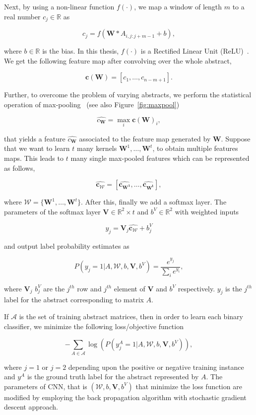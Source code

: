 Next, by using a non-linear function $f(\cdot)$, we map a window of length $m$ to a real number $c_j \in \mathbb{R}$ as 

\[c_j = f(\mathbf{W} * A_{i, j:j+m-1} + b),
\]
 
 where $b \in \mathbb{R}$ is the bias. In this thesis, $f(\cdot)$ is a Rectified Linear Unit (ReLU)~\cite{glorot2011deep, nair2010rectified}. We get the following feature map after convolving over the whole abstract,

 \[\mathbf{c(W)} = [c_1, \ldots, c_{n-m+1}].\]

 Further, to overcome the problem of varying abstracts, we perform the statistical operation of max-pooling~\cite{zhou1988image} (see also Figure~\ref{fig:maxpool})

 \[\widehat{c_{\mathbf{W}}} = \max_{i} \mathbf{c(W)}_i,\]

 that yields a feature $\widehat{c_{\mathbf{W}}}$ associated to the feature map generated by $\mathbf{W}$. Suppose that we want to learn $t$ many kernels $\mathbf{W}^1, \ldots, \mathbf{W}^t$, to obtain multiple features maps. This leads to $t$ many single max-pooled features which can be represented as follows,

 \[ \mathbf{\widehat{c_{\mathcal{W}}}} = [\mathbf{\widehat{c_{\mathbf{W}^1}}}, \ldots, \mathbf{\widehat{c_{\mathbf{W}^t}}}],
 \]

 where $\mathcal{W} = \{\mathbf{W}^1, \ldots, \mathbf{W}^t\}$. After this, finally we add a softmax layer. The parameters of the softmax layer $\mathbf{V} \in \mathbb{R}^2 \times t$ and $b^{V} \in \mathbb{R}^2$ with weighted inputs 

 \[y_j = \mathbf{V}_j \mathbf{\widehat{c_{\mathcal{W}}}} + b^{V}_j\]

and output label probability estimates as

\[P(y_j = 1 | A, \mathcal{W}, b, \mathbf{V}, b^{V}) = \frac{e^{y_j}}{\sum_i e^{y_i}},\]

where $\mathbf{V}_j$ $b^{V}_j$ are the $j^{th}$ row and $j^{th}$ element of $\mathbf{V}$ and $b^{V}$ respectively. $y_j$ is the $j^{th}$ label for the abstract corresponding to matrix $A$. 

If $\mathcal{A}$ is the set of training abstract matrices, then in order to learn each binary classifier, we minimize the following loss/objective function

\[- \sum_{A \in \mathcal{A}} \log(P(y_j^A = 1 | A, \mathcal{W}, b, \mathbf{V}, b^{V})),\]

where $j=1$ or $j=2$ depending upon the positive or negative training instance and $y^A$ is the ground truth label for the abstract represented by $A$. The parameters of CNN, that is $(\mathcal{W}, b, \mathbf{V}, b^{V})$ that minimize the loss function are modified by employing the back propagation algorithm with stochastic gradient descent approach. 

